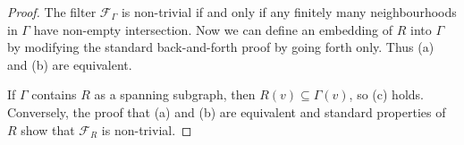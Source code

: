 \documentclass[10pt,a4paper]{amsart}
\begin{document}
\begin{proof}
The filter $\mathcal{F}_\Gamma$ is non-trivial if and only if any finitely
many neighbourhoods in $\Gamma$ have non-empty intersection. Now we can
define an embedding of $R$ into $\Gamma$ by modifying the standard
back-and-forth proof by going forth only. Thus (a) and (b) are equivalent.

If $\Gamma$ contains $R$ as a spanning subgraph, then $R(v)\subseteq\Gamma(v)$,
so (c) holds. Conversely, the proof that (a) and (b) are equivalent and 
standard properties of $R$ show that $\mathcal{F}_R$ is non-trivial.
\end{proof}
\end{document}
